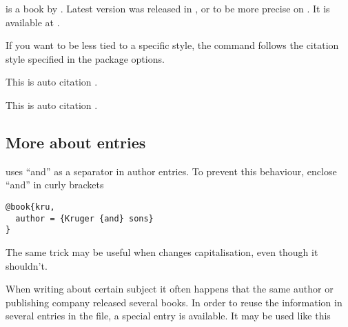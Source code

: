\begin{example}[standalone,
  biber,
  paperwidth=5cm,
  paperheight=4cm,
]
\usepackage{biblatex}

\sloppy

\noindent
 is a book by
\citeauthor{lshort}. Latest version
was released in \citeyear{lshort},
or to be more precise on
. It is available
at .

\end{example}

If you want to be less tied to a specific style, the 
command follows the citation style specified in the package options.

\begin{example}[standalone,
  biber,
  paperwidth=5cm,
  paperheight=4cm,
]
\usepackage[
  style=verbose,
  autocite=footnote,
]{biblatex}



\sloppy

\noindent
This is auto citation
\autocite{curie}.

\end{example}

\begin{example}[standalone,
  biber,
  paperwidth=5cm,
  paperheight=2cm,
]
\usepackage[
  style=authoryear,
  autocite=inline,
]{biblatex}


\sloppy

\noindent
This is auto citation \autocite{curie}.

\end{example}

\subsection{More about entries}

 uses ``and'' as a separator in author entries. To prevent
this behaviour, enclose ``and'' in curly brackets
\begin{verbatim}
@book{kru,
  author = {Kruger {and} sons}
}
\end{verbatim}
The same trick may be useful when  changes capitalisation, even
though it shouldn't.

When writing about certain subject it often happens that the same author or
publishing company released several books. In order to reuse the information in
several entries in the  file, a special entry  is available. It may be used
like this

